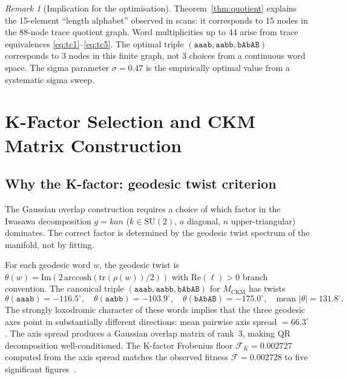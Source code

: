 \documentclass[11pt,a4paper]{article}
\theoremstyle{remark}
\newtheorem{remark}[theorem]{Remark}
\newcommand{\MCKM}{M_{\mathrm{CKM}}}
\begin{document}
\begin{remark}[Implication for the optimisation]
Theorem~\ref{thm:quotient} explains the 15-element ``length alphabet''
observed in scans: it corresponds to 15 nodes in the 88-node trace
quotient graph.
Word multiplicities up to 44 arise from trace equivalences
\eqref{eq:tc1}--\eqref{eq:tc5}.
The optimal triple $(\mathtt{aaab}, \mathtt{aabb}, \mathtt{bAbAB})$
corresponds to 3 nodes in this finite graph, not 3 choices from a
continuous word space.
The sigma parameter $\sigma = 0.47$ is the empirically optimal value
from a systematic sigma sweep.
\end{remark}

\section{K-Factor Selection and CKM Matrix Construction}

\subsection{Why the K-factor: geodesic twist criterion}
\label{subsec:kvn}

The Gaussian overlap construction requires a choice of which factor
in the Iwasawa decomposition $g = kan$ ($k \in \mathrm{SU}(2)$,
$a$ diagonal, $n$ upper-triangular) dominates.
The correct factor is determined by the geodesic twist spectrum of
the manifold, not by fitting.

For each geodesic word $w$, the geodesic twist is
$\theta(w) = \mathrm{Im}(2\,\mathrm{arccosh}(\mathrm{tr}(\rho(w))/2))$
with $\mathrm{Re}(\ell) > 0$ branch convention.
The canonical triple $(\mathtt{aaab}, \mathtt{aabb}, \mathtt{bAbAB})$
for $\MCKM$ has twists
\begin{equation}
\theta(\mathtt{aaab}) = -116.5^\circ,\quad
\theta(\mathtt{aabb}) = -103.9^\circ,\quad
\theta(\mathtt{bAbAB}) = -175.0^\circ,
\quad \text{mean } |\theta| = 131.8^\circ.
\label{eq:ckm_twists}
\end{equation}
The strongly loxodromic character of these words implies that the three
geodesic axes point in substantially different directions:
mean pairwise axis spread $= 66.3^\circ$.
The axis spread produces a Gaussian overlap matrix of rank~3,
making QR decomposition well-conditioned.
The K-factor Frobenius floor $\mathcal{F}_K = 0.002727$ computed from
the axis spread matches the observed fitness $\mathcal{F} = 0.002728$
to five significant figures~\cite{Gentry:arith}.
\end{document}

